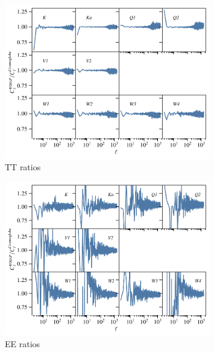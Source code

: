 \documentclass[twocolumn]{../../common/aa}
\begin{document}
\begin{figure}
	\centering
	\includegraphics[width=0.8\textwidth]{figures/TT_spectra_ratio.pdf}
	\caption{TT ratios}
\end{figure}
\begin{figure}
	\centering
	\includegraphics[width=0.8\textwidth]{figures/EE_spectra_ratio.pdf}
	\caption{EE ratios}
\end{figure}
\end{document}
